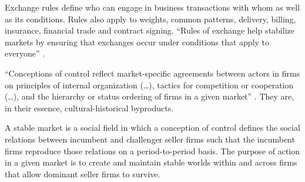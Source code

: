 \documentclass[a4paper, 12pt, openright, oneside, german, french, brazil, english, article]{abntex2}
\begin{document}
	Exchange rules define who can engage in business transactions with whom as well as its conditions. Rules also apply to weights, common patterns, delivery, billing, insurance, financial trade and contract signing. ``Rules of exchange help stabilize markets by ensuring that exchanges occur under conditions that apply to everyone'' \cite[p. 35]{fligstein2002architecture}.
	
	
	``Conceptions of control reflect market-specific agreements between actors in firms on principles of internal organization (\dots), tactics for competition or cooperation (\dots), and the hierarchy or status ordering of firms in a given market'' \cite[p. 35]{fligstein2002architecture}. They are, in their essence, cultural-historical byproducts.

	
	\begin{citacao}
		A stable market is a social field in which a conception of control defines the social relations between incumbent and challenger seller firms such that the incumbent firms reproduce those relations on a period-to-period basis. The purpose of action in a given market is to create and maintain stable worlds within and across firms that allow dominant seller firms to survive. \cite[p. 35]{fligstein2002architecture}
	\end{citacao}
	
\end{document}

